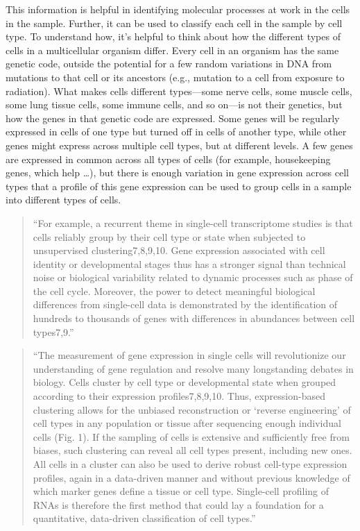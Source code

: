 \documentclass[
]{book}
\begin{document}
This information is helpful in identifying molecular processes at work in the
cells in the sample. Further, it can be used to classify each cell in the
sample by cell type. To understand how, it's helpful to think about how
the different types of cells in a multicellular organism differ. Every cell
in an organism has the same genetic code, outside the potential for a few
random variations in DNA from mutations to that cell or its ancestors
(e.g., mutation to a cell from exposure to radiation). What makes cells
different types---some nerve cells, some muscle cells, some lung tissue
cells, some immune cells, and so on---is not their genetics, but how the
genes in that genetic code are expressed. Some genes will be regularly
expressed in cells of one type but turned off in cells of another type,
while other genes might express across multiple cell types, but at different
levels. A few genes are expressed in common across all types of cells
(for example, housekeeping genes, which help \ldots), but there is enough
variation in gene expression across cell types that a profile of this
gene expression can be used to group cells in a sample into different
types of cells.

\begin{quote}
``For example, a recurrent theme in single-cell transcriptome studies is that
cells reliably group by their cell type or state when subjected to unsupervised
clustering7,8,9,10. Gene expression associated with cell identity or
developmental stages thus has a stronger signal than technical noise or
biological variability related to dynamic processes such as phase of the cell
cycle. Moreover, the power to detect meaningful biological differences from
single-cell data is demonstrated by the identification of hundreds to thousands
of genes with differences in abundances between cell types7,9.''
\citep{sandberg2014entering}
\end{quote}

\begin{quote}
``The measurement of gene expression in single cells will revolutionize our
understanding of gene regulation and resolve many longstanding debates in
biology. Cells cluster by cell type or developmental state when grouped
according to their expression profiles7,8,9,10. Thus, expression-based
clustering allows for the unbiased reconstruction or `reverse engineering' of
cell types in any population or tissue after sequencing enough individual cells
(Fig. 1). If the sampling of cells is extensive and sufficiently free from
biases, such clustering can reveal all cell types present, including new ones.
All cells in a cluster can also be used to derive robust cell-type expression
profiles, again in a data-driven manner and without previous knowledge of which
marker genes define a tissue or cell type. Single-cell profiling of RNAs is
therefore the first method that could lay a foundation for a quantitative,
data-driven classification of cell types.'' \citep{sandberg2014entering}
\end{quote}
\end{document}
